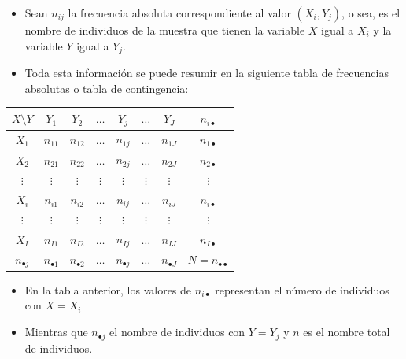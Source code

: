 \begin{frame}
\begin{itemize}
\item Sean $n_{ij}$ la frecuencia absoluta correspondiente al valor  $(X_i,Y_j)$, o sea, es el
nombre de individuos de la muestra que tienen la variable $X$ igual a $X_i$ y la variable
$Y$ igual a $Y_j$.
\item Toda esta información se puede resumir en la siguiente tabla de frecuencias absolutas o
tabla de contingencia:
\end{itemize}
\end{frame}

\begin{frame}
\begin{center}
\begin{tabular}{|c|cccccc|c|}
\hline $X\mbox{\textbackslash} Y$ & $Y_1$ & $Y_2$ & $\ldots$ & $Y_j$ & $\ldots$ & $Y_J$ & $n_{i \bullet}$ \\
\hline $X_1$ & $n_{11}$ & $n_{12}$ & $\ldots$ & $n_{1j}$ & $\ldots$ & $n_{1J}$ & $n_{1
\bullet}$ \\ $X_2$ & $n_{21}$ & $n_{22}$ & $\ldots$ & $n_{2j}$ & $\ldots$ & $n_{2J}$ &
$n_{2 \bullet}$ \\ $\vdots$ & $\vdots$ & $\vdots$ & $\vdots$ & $\vdots$ & $\vdots$ &
$\vdots$ & $\vdots$ \\ $X_i$ & $n_{i1}$ & $n_{i2}$ & $\ldots$ & $n_{ij}$ & $\ldots$ &
$n_{iJ}$ & $n_{i \bullet}$ \\ $\vdots$ & $\vdots$ & $\vdots$ & $\vdots$ & $\vdots$ &
$\vdots$ & $\vdots$ & $\vdots$ \\ $X_I$ & $n_{I1}$ & $n_{I2}$ & $\ldots$ & $n_{Ij}$ &
$\ldots$ & $n_{IJ}$ & $n_{I \bullet}$ \\ \hline $n_{\bullet j}$ & $n_{\bullet 1}$ &
$n_{\bullet 2}$ & $\ldots$ & $n_{\bullet j}$ & $\ldots$ & $n_{\bullet J}$ &
$N=n_{\bullet\bullet}$ \\ \hline
\end{tabular}
\end{center}
\end{frame}

\begin{frame}
\begin{itemize}
\item En la tabla anterior, los valores de $n_{i\bullet}$ representan el número de individuos
con $X=X_i$
\item Mientras que  $n_{\bullet j}$ el nombre de individuos con $Y=Y_j$ y $n$  es el nombre
total de individuos.
\end{itemize}
\end{frame}

